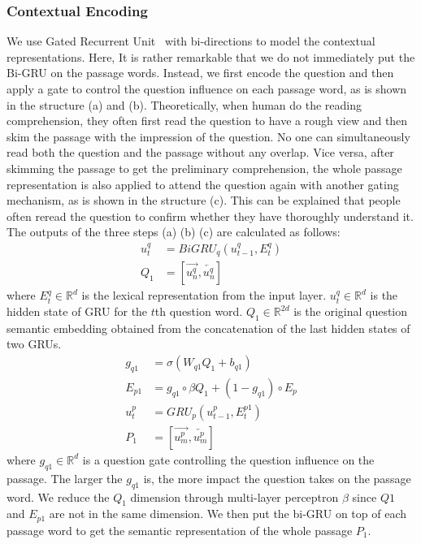 \documentclass[letterpaper]{article} %
\begin{document}
 \subsubsection{Contextual Encoding} We use Gated Recurrent Unit~\cite{Cho2014Learning} with bi-directions to model the contextual representations. Here, It is rather remarkable that we do not immediately put the Bi-GRU on the passage words. Instead, we first encode the question and then apply a gate to control the question influence on each passage word, as is shown in the structure (a) and (b). Theoretically, when human do the reading comprehension, they often first read the question to have a rough view and then skim the passage with the impression of the question. No one can simultaneously read both the question and the passage without any overlap. Vice versa, after skimming the passage to get the preliminary comprehension, the whole passage representation is also applied to attend the question again with another gating mechanism, as is shown in the structure (c). This can be explained that people often reread the question to confirm whether they have thoroughly understand it. The outputs of the three steps (a) (b) (c) are calculated as follows:
 \begin{align*}
u^q_t &= BiGRU_q(u^q_{t-1}, E_t^q) \\
Q_1&= \left [ \overrightarrow{u_n^q},\overleftarrow{u_n^q} \right ] \tag{4}
 \end{align*} 
 where $E_t^q \in \mathbb{R}^d $ is the lexical representation from the input layer. $u_t^q  \in \mathbb{R}^d$ is the hidden state of GRU for the $t$th question word. $Q_1 \in \mathbb{R}^{2d}$ is the original question semantic embedding obtained from the concatenation of the last hidden states of two GRUs.  
 \begin{align*}
g_{q1}&=\sigma(W_{q1}Q_1+b_{q1})\\
E_{p1}&=g_{q1}\circ \beta Q_1+(1-g_{q1})\circ E_p\\
u_t^p&=GRU_p(u_{t-1}^p,E_t^{p1})\\
P_1&= \left [ \overrightarrow{u_m^p},\overleftarrow{u_m^p} \right ] \tag{5}
\end{align*}
where $g_{q1} \in \mathbb{R}^d$ is a question gate controlling the question influence on the passage. The larger the $g_{q1}$ is, the more impact the question takes on the passage word. We reduce the $Q_1$ dimension through multi-layer perceptron $\beta$ since $Q1$ and $E_{p1}$ are not in the same dimension. We then put the bi-GRU on top of each passage word to get the semantic representation of the whole passage $P_1$.    
\end{document}
